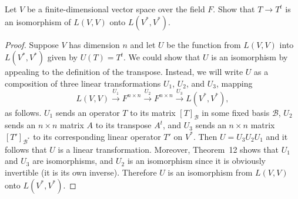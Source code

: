  Let $V$ be a finite-dimensional vector space over the field
$F$. Show that $T\to T^t$ is an isomorphism of $L(V,V)$ onto
$L(V^*,V^*)$.
\begin{proof}
  Suppose $V$ has dimension $n$ and let $U$ be the function from
  $L(V,V)$ into $L(V^*,V^*)$ given by $U(T) = T^t$. We could show that
  $U$ is an isomorphism by appealing to the definition of the
  transpose. Instead, we will write $U$ as a composition of three
  linear transformations $U_1$, $U_2$, and $U_3$, mapping
  \begin{equation*}
    L(V, V) \xrightarrow{U_1} F^{n\times n} \xrightarrow{U_2} F^{n\times n}
    \xrightarrow{U_3} L(V^*, V^*),
  \end{equation*}
  as follows. $U_1$ sends an operator $T$ to its matrix
  $[T]_{\mathcal{B}}$ in some fixed basis $\mathcal{B}$, $U_2$ sends
  an $n\times n$ matrix $A$ to its transpose $A^t$, and $U_3$ sends an
  $n\times n$ matrix $[T']_{\mathcal{B}^*}$ to its corresponding
  linear operator $T'$ on $V^*$. Then $U = U_3U_2U_1$ and it follows
  that $U$ is a linear transformation. Moreover, Theorem~12 shows that
  $U_1$ and $U_3$ are isomorphisms, and $U_2$ is an isomorphism since
  it is obviously invertible (it is its own inverse). Therefore $U$ is
  an isomorphism from $L(V,V)$ onto $L(V^*,V^*)$.
\end{proof}

